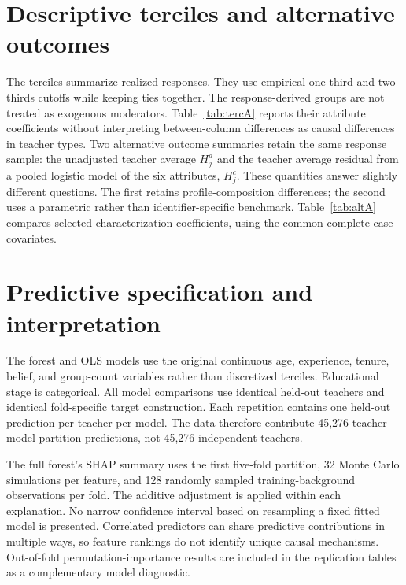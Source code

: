 \section{Descriptive terciles and alternative outcomes}\label{app:terciles}
The terciles summarize realized responses. They use empirical one-third and two-thirds cutoffs while keeping ties together. The response-derived groups are not treated as exogenous moderators. Table~\ref{tab:tercA} reports their attribute coefficients without interpreting between-column differences as causal differences in teacher types.
Two alternative outcome summaries retain the same response sample: the unadjusted teacher average $H^a_j$ and the teacher average residual from a pooled logistic model of the six attributes, $H^c_j$. These quantities answer slightly different questions. The first retains profile-composition differences; the second uses a parametric rather than identifier-specific benchmark. Table~\ref{tab:altA} compares selected characterization coefficients, using the common complete-case covariates.

\section{Predictive specification and interpretation}\label{app:prediction}
\begin{addition}
The forest and OLS models use the original continuous age, experience, tenure, belief, and group-count variables rather than discretized terciles. Educational stage is categorical. All model comparisons use identical held-out teachers and identical fold-specific target construction. Each repetition contains one held-out prediction per teacher per model. The data therefore contribute 45,276 teacher-model-partition predictions, not 45,276 independent teachers.

The full forest's SHAP summary uses the first five-fold partition, 32 Monte Carlo simulations per feature, and 128 randomly sampled training-background observations per fold. The additive adjustment is applied within each explanation. No narrow confidence interval based on resampling a fixed fitted model is presented. Correlated predictors can share predictive contributions in multiple ways, so feature rankings do not identify unique causal mechanisms. Out-of-fold permutation-importance results are included in the replication tables as a complementary model diagnostic.
\end{addition}

